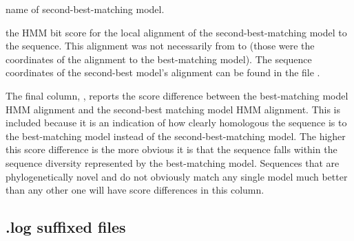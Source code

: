 \begin{wideitem}
\item[\emprog{model name}] name of second-best-matching model.

\item[\emprog{HMM sc}] the HMM bit score for the local alignment of
  the second-best-matching model to the sequence. This alignment was
  not necessarily from  to  (those were the
  coordinates of the alignment to the best-matching model). The
  sequence coordinates of the second-best model's alignment can be
  found in the file .
\end{wideitem}

The final column, , reports the score difference between
the best-matching model HMM alignment and the second-best matching
model HMM alignment. This is included because it is an indication of
how clearly homologous the sequence is to the best-matching model
instead of the second-best-matching model. The higher this score
difference is the more obvious it is that the sequence falls within
the sequence diversity represented by the best-matching model.
Sequences that are phylogenetically novel and do not obviously match
any single model much better than any other one will have score
differences in this column.

\subsection{.log suffixed files}
